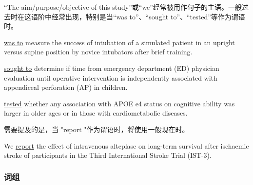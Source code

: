 \documentclass[a4paper]{ctexbook}
\begin{document}
    “The aim/purpose/objective of this study”或“we”经常被用作句子的主语。一般过去时在这语阶中经常出现，特别是当“was to”、“sought to”、“tested”等作为谓语时。

    \begin{eg}{}
       \uline{was to} measure the success of intubation of a simulated patient in an upright versus supine position by novice intubators after brief training.
    \end{eg}
    \begin{eg}{}
       \uline{sought to} determine if time from emergency department (ED) physician evaluation until operative intervention is independently associated with appendiceal perforation (AP) in children.
    \end{eg}
    \begin{eg}{}
       \uline{tested} whether any association with APOE e4 status on cognitive ability was larger in older ages or in those with cardiometabolic diseases.
    \end{eg}
    
    
    需要提及的是，当 "report "作为谓语时，将使用一般现在时。

    \begin{eg}{}
      We \uline{report} the effect of intravenous alteplase on long-term survival after ischaemic stroke of participants in the Third International Stroke Trial (IST-3).
    \end{eg}

    \subsubsection{词组}
\end{document}
